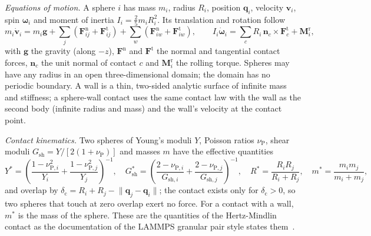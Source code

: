 \emph{Equations of motion.} A sphere $i$ has mass $m_i$, radius $R_i$, position $\mathbf q_i$, velocity $\mathbf v_i$, spin $\boldsymbol\omega_i$ and moment
of inertia $I_i=\tfrac25 m_iR_i^2$. Its translation and rotation follow
\begin{equation}
m_i\dot{\mathbf v}_i = m_i\mathbf g + \sum_{j}\left(\mathbf F^{\mathrm n}_{ij}+\mathbf F^{\mathrm t}_{ij}\right) + \sum_{w}\left(\mathbf F^{\mathrm n}_{iw}+\mathbf F^{\mathrm t}_{iw}\right),\qquad
I_i\dot{\boldsymbol\omega}_i = \sum_{c} R_i\,\mathbf n_c\times\mathbf F^{\mathrm t}_c + \mathbf M^{\mathrm r}_i ,
\label{eq:dem-newton}
\end{equation}
with $\mathbf g$ the gravity (along $-z$), $\mathbf F^{\mathrm n}$ and $\mathbf F^{\mathrm t}$ the normal and tangential contact forces, $\mathbf n_c$ the
unit normal of contact $c$ and $\mathbf M^{\mathrm r}_i$ the rolling torque. Spheres may have any radius in an open three-dimensional domain; the domain has
no periodic boundary. A wall is a thin, two-sided analytic surface of infinite mass and stiffness; a sphere-wall contact uses the same contact law with
the wall as the second body (infinite radius and mass) and the wall's velocity at the contact point.

\emph{Contact kinematics.} Two spheres of Young's moduli $Y$, Poisson ratios $\nu_{\mathrm P}$, shear moduli $G_{\mathrm{sh}}=Y/[2(1+\nu_{\mathrm P})]$ and masses $m$ have the
effective quantities
\begin{equation}
Y^{\ast} = \left(\frac{1-\nu_{\mathrm P,i}^2}{Y_i}+\frac{1-\nu_{\mathrm P,j}^2}{Y_j}\right)^{-1},\quad
G^{\ast}_{\mathrm{sh}} = \left(\frac{2-\nu_{\mathrm P,i}}{G_{\mathrm{sh},i}}+\frac{2-\nu_{\mathrm P,j}}{G_{\mathrm{sh},j}}\right)^{-1},\quad
R^{\ast}=\frac{R_iR_j}{R_i+R_j},\quad m^{\ast}=\frac{m_im_j}{m_i+m_j},
\label{eq:dem-eff}
\end{equation}
and overlap by $\delta_{\mathrm c}=R_i+R_j-\lVert\mathbf q_j-\mathbf q_i\rVert$; the contact exists only for $\delta_{\mathrm c}>0$, so two spheres that touch
at zero overlap exert no force. For a contact with a wall, $m^{\ast}$ is the mass of the sphere. These are the quantities of the Hertz-Mindlin
contact as the documentation of the LAMMPS granular pair style states them~\cite{lammpsgranular}.

